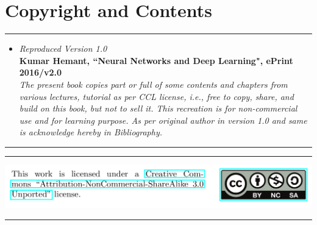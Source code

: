 \documentclass[a4paper,12pt]{report}%
\begin{document}
{\color{IAF}
\section*{\Large Copyright and Contents}
\hrule
\begin{itemize}

\item {\it Reproduced Version 1.0}  \\
    {\bf Kumar Hemant, ``Neural Networks and Deep Learning", ePrint 2016/v2.0} \\
    {\it The present book copies part or full of some contents and chapters from various lectures, tutorial as per CCL license, i.e., free to copy, share, and build on this book, but not to sell it. This recreation is for non-commercial use and for learning purpose. As per original author in version 1.0 and same is acknowledge hereby in Bibliography.}

\end{itemize}
\hrule
}


\vspace*{3cm}


\hrule

\includegraphics[width=\linewidth]{./images/ccl.png}

\hrule
\setcounter{page}{5}
\tableofcontents{}

\newpage

\setcounter{page}{8}


%
%
%
%
\end{document}
